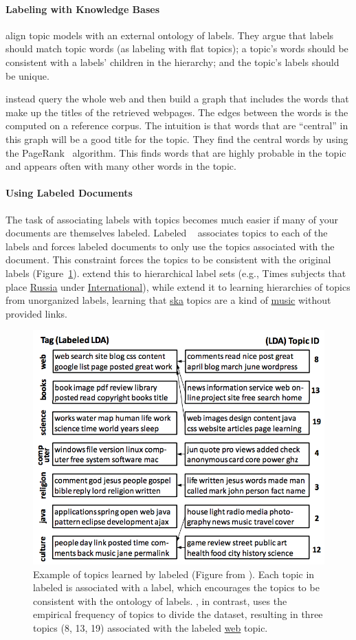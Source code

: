 \paragraph{Labeling with Knowledge Bases}

\citet{mao-12} align topic models with an external ontology of
labels.  They argue that labels should match topic words (as labeling with flat
topics); a topic's words should be consistent with a labels' children in the
hierarchy; and the topic's labels should be unique.

\citet{aleteras-14} instead query the whole web and then build a graph that
includes the words that make up the titles of the retrieved webpages. The edges
between the words is the  computed on a reference corpus.  The
intuition is that words that are ``central'' in this graph will be a good title
for the topic.  They find the central words by using the PageRank~\citep{page-99}
algorithm.  This finds words that are highly probable in the topic and appears
often with many other words in the topic.

\paragraph{Using Labeled Documents}

The task of associating labels with topics becomes much easier if many of your
documents are themselves labeled.  Labeled ~\citep{ramage-09}
associates topics to each of the labels and forces labeled documents to only use
the topics associated with the document.  This constraint forces the topics to
be consistent with the original labels (Figure~\ref{fig:llda}).
\citet{Bakalov-12} extend this to hierarchical label sets (e.g.,  Times
subjects that place \underline{Russia} under \underline{International}), while
\citet{nguyen:boyd-graber:resnik:chang-2014} extend it to learning hierarchies
of topics from unorganized labels, learning that \underline{ska} topics are a
kind of \underline{music} without provided links.

\begin{figure}
  \includegraphics[width=.5\linewidth]{figures/viz_llda}
  \caption{Example of topics learned by labeled  (Figure from
    \citet{ramage-09}).  Each topic in labeled  is associated with a
    label, which encourages the topics to be consistent with the ontology of
    labels.  , in contrast, uses the empirical frequency of topics to
    divide the dataset, resulting in three topics (8, 13, 19) associated with
    the labeled  \underline{web} topic. }
  \label{fig:llda}
\end{figure}


